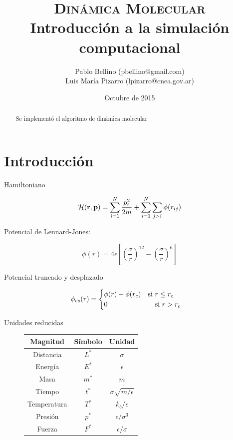 \documentclass[a4paper,12pt]{article}
\title{\textsc{Dinámica Molecular} \\ \vspace{2em} \Large{Introducción a la 
simulación computacional}}
\author{\small{ Pablo Bellino (pbellino@gmail.com)} \\
        \small{Luis María Pizarro (lpizarro@cnea.gov.ar)}}
\date{Octubre de 2015}
\begin{document}

\maketitle

\begin{abstract}
Se implementó el algoritmo de dinámica molecular 
\end{abstract}


\section{Introducción}

Hamiltoniano

\begin{equation}\label{eq:hamiltoniano}
  \mathcal H({\bf r},{\bf p}) = \sum_{i=1}^{N} \frac{p_i^2}{2m} + \sum_{i=1}^N \sum_{j>i} \phi (r_{ij})
\end{equation}

Potencial de Lennard-Jones:

\begin{equation}\label{eq:pot_LJ}
  \phi (r) = 4\epsilon\left[\left(\frac{\sigma}{r}\right)^{12} -\left(\frac{\sigma}{r}\right)^{6}\right]
\end{equation}

Potencial truncado y desplazado

\begin{equation}\label{eq:pot_cs}
  \phi_{cs}(r) = 
  \begin{cases}
	  \phi(r)- \phi(r_c) \quad \text{si } r \leq r_c \\
	  0 \hspace{2.4cm} \text{si } r > r_c
  \end{cases}
\end{equation}

Unidades reducidas

\begin{figure}
	\label{tb:unidades}
	\begin{center}
\begin{tabular}{ccc}
	\hline
	{\bf Magnitud} & {\bf Símbolo} & {\bf Unidad} \\ \hline
	 Distancia & $L^*$& $\sigma$ \\ 
	Energía &$E^*$& $\epsilon$ \\ 
	Masa &$m^*$& $m$ \\ 
	Tiempo &$t^*$& $\sigma\sqrt{m/\epsilon}$ \\ 
	Temperatura &$T^*$& $k_b/\epsilon$ \\ 
	Presión &$p^*$& $\epsilon/\sigma^3$ \\ 
	Fuerza &$F^*$& $\epsilon/\sigma$ \\ 
	\hline 
\end{tabular}
\end{center} 
\end{figure}
\end{document}
